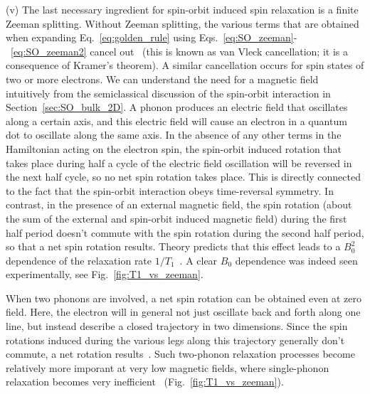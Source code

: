 \documentclass[12pt,aps,nofootinbib]{revtex4-1}
\begin{document}
(v) The last necessary ingredient for spin-orbit induced spin
relaxation is a finite Zeeman splitting. Without Zeeman splitting,
the various terms that are obtained when expanding Eq.~\ref{eq:golden_rule} using Eqs.~\ref{eq:SO_zeeman}-~\ref{eq:SO_zeeman2} cancel out~\cite{khaetskii01} (this is known as van Vleck cancellation; it is a consequence of Kramer's theorem). A similar cancellation occurs
for spin states of two or more electrons. We can understand the need for a magnetic field intuitively from the semiclassical discussion of the spin-orbit interaction in Section~\ref{sec:SO_bulk_2D}. A phonon produces an electric field that oscillates along a certain axis, and this electric field will cause an electron in a quantum dot to
oscillate along the same axis. In the absence of any other terms
in the Hamiltonian acting on the electron spin, the spin-orbit
induced rotation that takes place during half a cycle of the 
electric field oscillation will be reversed in the next half cycle, so no net spin rotation takes place. This is
directly connected to the fact that the spin-orbit interaction
obeys time-reversal symmetry. In contrast, in the presence of an
external magnetic field, the spin rotation (about the sum of the
external and spin-orbit induced magnetic field) during the first
half period doesn't commute with the spin rotation during the
second half period, so that a net spin rotation results. 
Theory predicts that this effect leads to a $B_0^2$ dependence of the relaxation rate $1/T_1$~\cite{khaetskii01,bulaev05,golovach07}. A clear $B_0$ dependence was indeed seen experimentally, see Fig.~\ref{fig:T1_vs_zeeman}.

When two phonons are involved, a net spin rotation can be obtained even at zero field. Here, the electron will in general not just oscillate back and forth along one line, but instead describe a closed trajectory in two dimensions. Since the spin rotations induced during the various legs along this trajectory generally don't commute, a net rotation results~\cite{sanjose06}.
Such two-phonon relaxation processes become relatively more imporant at very low magnetic fields, where single-phonon relaxation becomes very inefficient~\cite{khaetskii01,sanjose06} (Fig.~\ref{fig:T1_vs_zeeman}).
\end{document}
